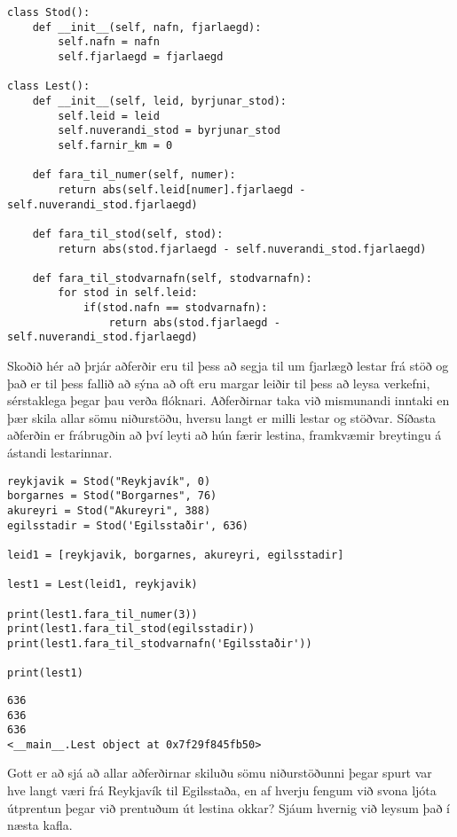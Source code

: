 \begin{lstlisting}[caption=Aðferðir kynntar með lestarkerfi, label=lst:klasar-aðferðir-lestar]
class Stod():
	def __init__(self, nafn, fjarlaegd):
		self.nafn = nafn
		self.fjarlaegd = fjarlaegd
		
class Lest():
	def __init__(self, leid, byrjunar_stod):
		self.leid = leid
		self.nuverandi_stod = byrjunar_stod
		self.farnir_km = 0
	
	def fara_til_numer(self, numer):
		return abs(self.leid[numer].fjarlaegd - self.nuverandi_stod.fjarlaegd)
	
	def fara_til_stod(self, stod):
		return abs(stod.fjarlaegd - self.nuverandi_stod.fjarlaegd)
	
	def fara_til_stodvarnafn(self, stodvarnafn):
		for stod in self.leid:
			if(stod.nafn == stodvarnafn):
				return abs(stod.fjarlaegd - self.nuverandi_stod.fjarlaegd)
\end{lstlisting}

Skoðið hér að þrjár aðferðir eru til þess að segja til um fjarlægð lestar frá stöð og það er til þess fallið að sýna að oft eru margar leiðir til þess að leysa verkefni, sérstaklega þegar þau verða flóknari.
Aðferðirnar taka við mismunandi inntaki en þær skila allar sömu niðurstöðu, hversu langt er milli lestar og stöðvar.
Síðasta aðferðin er frábrugðin að því leyti að hún færir lestina, framkvæmir breytingu á ástandi lestarinnar.

\begin{lstlisting}[caption=Tilvik af lestum og stöðvum búin til og notuð, label=lst:klasar-aðferðir-lestar-2]
reykjavik = Stod("Reykjavík", 0)
borgarnes = Stod("Borgarnes", 76)
akureyri = Stod("Akureyri", 388)
egilsstadir = Stod('Egilsstaðir', 636)

leid1 = [reykjavik, borgarnes, akureyri, egilsstadir]

lest1 = Lest(leid1, reykjavik)

print(lest1.fara_til_numer(3))
print(lest1.fara_til_stod(egilsstadir))
print(lest1.fara_til_stodvarnafn('Egilsstaðir'))

print(lest1)
\end{lstlisting}
\lstset{style=uttak}
\begin{lstlisting}
636
636
636
<__main__.Lest object at 0x7f29f845fb50>
\end{lstlisting}
\lstset{style=venjulegt}

Gott er að sjá að allar aðferðirnar skiluðu sömu niðurstöðunni þegar spurt var hve langt væri frá Reykjavík til Egilsstaða, en af hverju fengum við svona ljóta útprentun þegar við prentuðum út lestina okkar?
Sjáum hvernig við leysum það í næsta kafla.

